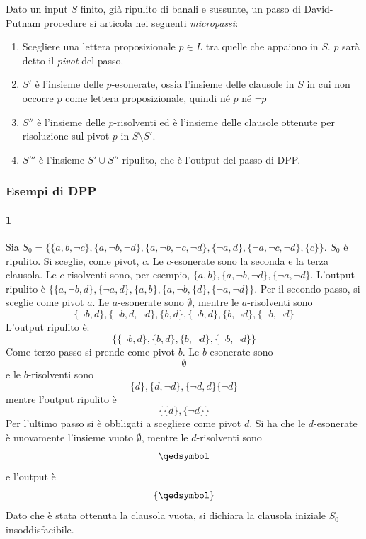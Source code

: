 \begin{defi}
        Dato un  input $S$ finito, già ripulito di banali e sussunte, 
        un passo di David-Putnam procedure 
        si articola nei seguenti \textit{micropassi}: 
        \begin{enumerate}
                \item Scegliere una lettera proposizionale $p \in L$ 
                        tra quelle che appaiono in $S$. $p$ sarà detto 
                        il \textit{pivot} del passo.
                \item $S'$ è l'insieme delle $p$-esonerate, ossia 
                        l'insieme delle clausole in $S$ in cui non 
                        occorre $p$ come lettera proposizionale, quindi 
                        né $p$ né $\neg p$
                \item $S''$ è l'insieme delle $p$-risolventi ed è l'insieme 
                        delle clausole ottenute per risoluzione sul pivot 
                        $p$ in $S\setminus S'$. 
                \item $S'''$ è l'insieme  $S' \cup S''$ ripulito, che è 
                        l'output del passo di DPP.
        \end{enumerate}
\end{defi}

\subsubsection{Esempi di DPP}
\paragraph{1}
Sia $S_0 = \{\{a,b,\neg c\}, \{a, \neg b, \neg d\}, \{a, \neg b, \neg c, \neg d\}, 
\{\neg a, d\}, \{\neg a, \neg c, \neg d\}, \{c\}\}$. 
$S_0$ è ripulito. Si sceglie, come pivot, $c$. 
Le $c$-esonerate sono la seconda e la terza clausola. 
Le $c$-risolventi sono, per esempio, $\{a,b\}, \{a, \neg b, \neg d\}, \{\neg a, \neg d\}$. 
L'output ripulito è $\{\{a, \neg b, d\}, \{\neg a, d\}, \{a, b\}, \{a, \neg b, \{d\}, \{\neg a, \neg d\}\}$.
Per il secondo passo, si sceglie come pivot $a$. 
Le $a$-esonerate sono $\emptyset$, mentre le $a$-risolventi sono 
$$
\{\neg b, d\}, \{\neg b, d, \neg d\}, \{b, d\}, \{\neg b, d\}, \{b, \neg d\}, \{\neg b, \neg d\}
$$
L'output ripulito è: 
$$
\{\{\neg b, d\}, \{b, d\}, \{b, \neg d\}, \{\neg b, \neg d\}\}
$$
Come terzo passo si prende come pivot $b$. Le $b$-esonerate sono 
$$
\emptyset
$$
e le $b$-risolventi sono 
$$
\{d\},\{d, \neg d\}, \{\neg d, d\} \{\neg d\}
$$
mentre l'output ripulito è 
$$
\{\{d\}, \{\neg d\}\}
$$
Per l'ultimo passo si è obbligati a scegliere come pivot $d$. 
Si ha che le $d$-esonerate è nuovamente l'insieme vuoto $\emptyset$, 
mentre le $d$-risolventi sono 
$$
\qedsymbol
$$
e l'output è 
$$
\{\qedsymbol\}
$$
Dato che è stata ottenuta la clausola vuota, si dichiara la clausola 
iniziale $S_0$ insoddisfacibile. 

